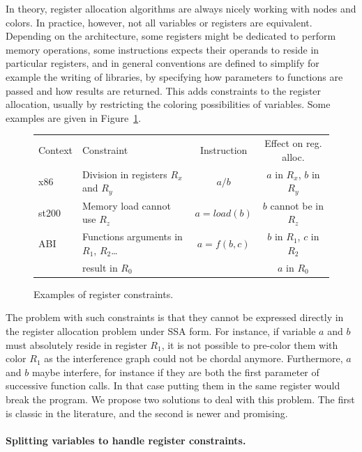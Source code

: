 {In theory, register allocation algorithms are always nicely working with nodes 
and colors. In practice, however, not all variables or registers are 
equivalent. Depending on the architecture, some registers might be dedicated 
to perform memory operations, some instructions expects their operands to 
reside in particular registers, and in general conventions are defined to 
simplify for example the writing of libraries, by specifying how parameters to 
functions are passed and how results are returned. This adds constraints to the 
register allocation, usually by restricting the coloring possibilities of 
variables. Some examples are given in Figure~\ref{fig:reg-constraints}.

\begin{figure}
  \begin{center}
    \begin{tabular}{llcc}
    Context & Constraint  & Instruction & Effect on reg. alloc. \\
    x86 & Division in registers $R_x$ and $R_y$ & $a / b$ & $a$ in $R_x$, $b$ in $R_y$\\
    st200 & Memory load cannot use $R_z$ & $a = load(b)$ & $b$ cannot be in $R_z$\\
    ABI & Functions arguments in $R_1$, $R_2$\ldots & $a = f(b,c)$ & $b$ in $R_1$, $c$ in $R_2$ \\
     & result in $R_0$ & & $a$ in $R_0$\\
  \end{tabular}
  \end{center}
  \caption{Examples of register constraints.}
  \label{fig:reg-constraints}
\end{figure}


The problem with such constraints is that they cannot be expressed directly in 
the register allocation problem under SSA form. For instance, if variable $a$ and $b$ must 
absolutely reside in register $R_1$, it is not possible to pre-color them with 
color $R_1$ as the interference graph could not be chordal anymore.  
Furthermore, $a$ and $b$ maybe interfere, for instance if they are both the 
first parameter of successive function calls. In that case putting them in the 
same register would break the program. We propose two solutions 
to deal with this problem. The first is classic in the literature, and the 
second is newer and promising.


\paragraph{Splitting variables to handle register constraints.}

}
